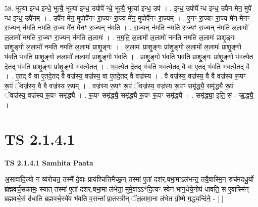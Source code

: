 \documentclass[17pt]{extarticle}
\begin{document}
58. भूत्या॑ इन्ध इन्धे॒ भूत्यै॒ भूत्या॑ इन्ध॒ उपोपे᳚ न्धे॒ भूत्यै॒ भूत्या॑ इन्ध॒ उप॑ । . इ॒न्ध॒ उपोपे᳚ न्ध इन्ध॒ उपै॑न मेन॒ मुपे᳚ न्ध इन्ध॒ उपै॑नम् । . उपै॑न मेन॒ मुपोपै॑नꣳ रा॒ज्यꣳ रा॒ज्य मे॑न॒ मुपोपै॑नꣳ रा॒ज्यम् । . ए॒नꣳ॒॒ रा॒ज्यꣳ रा॒ज्य मे॑न मेनꣳ रा॒ज्यन् न॑मति नमति रा॒ज्य मे॑न मेनꣳ रा॒ज्यन् न॑मति । . रा॒ज्यन् न॑मति नमति रा॒ज्यꣳ रा॒ज्यन् न॑मति ल॒लामो॑ ल॒लामो॑ नमति रा॒ज्यꣳ रा॒ज्यन् न॑मति ल॒लामः॑ । . न॒म॒ति॒ ल॒लामो॑ ल॒लामो॑ नमति नमति ल॒लामः॑ प्राशृ॒ङ्गः प्रा॑शृ॒ङ्गो ल॒लामो॑ नमति नमति ल॒लामः॑ प्राशृ॒ङ्गः । . ल॒लामः॑ प्राशृ॒ङ्गः प्रा॑शृ॒ङ्गो ल॒लामो॑ ल॒लामः॑ प्राशृ॒ङ्गो भ॑वति भवति प्राशृ॒ङ्गो ल॒लामो॑ ल॒लामः॑ प्राशृ॒ङ्गो भ॑वति । . प्रा॒शृ॒ङ्गो भ॑वति भवति प्राशृ॒ङ्गः प्रा॑शृ॒ङ्गो भ॑वत्ये॒त दे॒तद् भ॑वति प्राशृ॒ङ्गः प्रा॑शृ॒ङ्गो भ॑वत्ये॒तत् । . भ॒व॒त्ये॒त दे॒तद् भ॑वति भवत्ये॒तद् वै वा ए॒तद् भ॑वति भवत्ये॒तद् वै । . ए॒तद् वै वा ए॒तदे॒तद् वै वज्र॑स्य॒ वज्र॑स्य॒ वा ए॒तदे॒तद् वै वज्र॑स्य । . वै वज्र॑स्य॒ वज्र॑स्य॒ वै वै वज्र॑स्य रू॒पꣳ रू॒पं ॅवज्र॑स्य॒ वै वै वज्र॑स्य रू॒पम् । . वज्र॑स्य रू॒पꣳ रू॒पं ॅवज्र॑स्य॒ वज्र॑स्य रू॒पꣳ समृ॑द्ध्यै॒ समृ॑द्ध्यै रू॒पं ॅवज्र॑स्य॒ वज्र॑स्य रू॒पꣳ समृ॑द्ध्यै । . रू॒पꣳ समृ॑द्ध्यै॒ समृ॑द्ध्यै रू॒पꣳ रू॒पꣳ समृ॑द्ध्यै । . समृ॑द्ध्या॒ इति॒ सं - ऋ॒द्ध्यै॒ । \newline
\pagebreak
{}

\section{ TS 2.1.4.1 }

\textbf{TS 2.1.4.1 } \newline
\textbf{Samhita Paata} \newline

अ॒सावा॑दि॒त्यो न व्य॑रोचत॒ तस्मै॑ दे॒वाः प्राय॑श्चित्तिमैच्छ॒न् तस्मा॑ ए॒तां दश॑र्.षभा॒माऽल॑भन्त॒ तयै॒वास्मि॒न् रुच॑मदधु॒र्यो ब्र॑ह्मवर्च॒सका॑मः॒ स्यात् तस्मा॑ ए॒तां दश॑र्.षभा॒मा ल॑भेता॒-मुमे॒वाऽऽ*दि॒त्यꣳ स्वेन॑ भाग॒धेये॒नोप॑ धावति॒ स ए॒वास्मि॑न् ब्रह्मवर्च॒सं द॑धाति ब्रह्मवर्च॒स्ये॑व भ॑वति व॒सन्ता᳚ प्रा॒तस्त्रीन् ॅल॒लामा॒ना ल॑भेत ग्री॒ष्मे म॒द्ध्यन्दि॑ने॒ - [  ] \newline
\end{document}
